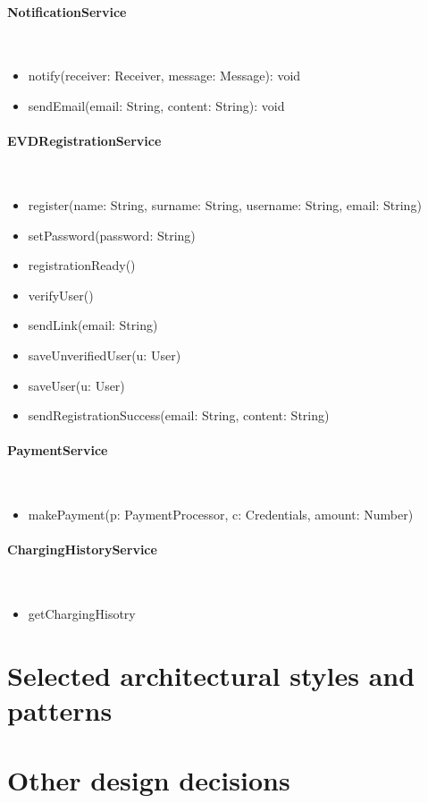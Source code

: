 \paragraph{NotificationService}\mbox{}\\
\begin{itemize}
    \item notify(receiver: Receiver, message:  Message): void
    \item sendEmail(email: String, content: String): void
\end{itemize}

\paragraph{EVDRegistrationService}\mbox{}\\
\begin{itemize}
    \item register(name: String, surname: String, username: String, email: String)
    \item setPassword(password: String)
    \item registrationReady()
    \item verifyUser()
    \item sendLink(email: String)
    \item saveUnverifiedUser(u: User)
    \item saveUser(u: User)
    \item sendRegistrationSuccess(email: String, content: String)
\end{itemize}

\paragraph{PaymentService}\mbox{}\\
\begin{itemize}
    \item makePayment(p: PaymentProcessor, c: Credentials, amount: Number)
\end{itemize}

\paragraph{ChargingHistoryService}\mbox{}\\
\begin{itemize}
    \item getChargingHisotry
\end{itemize}

\section{Selected architectural styles and patterns}

\section{Other design decisions}
